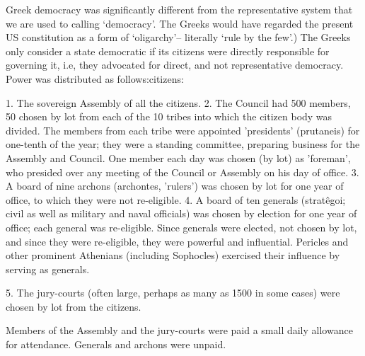 \documentclass[oneside]{article}
\begin{document}
Greek democracy was significantly different from the representative system that we are used to calling ‘democracy’. The Greeks would have regarded the present US constitution as a form of ‘oligarchy’– literally ‘rule by the few’.)  The Greeks only consider a state democratic  if its citizens were directly responsible for governing it, i.e, they advocated for direct, and not representative democracy. Power was distributed as follows:citizens: 

1. The sovereign Assembly of all the citizens. 
2. The Council had 500 members, 50 chosen by lot from each of the 10 tribes into which the citizen body was divided. The members from each tribe were appointed 'presidents' (prutaneis) for one-tenth of the year; they were a standing committee, preparing business for the Assembly and Council. One member each day was chosen (by lot) as 'foreman', who presided over any meeting of the Council or Assembly on his day of office.  
3. A board of nine archons (archontes, 'rulers') was chosen by lot for one year of office, to which they were not re-eligible. 
4. A board of ten generals (stratêgoi;  civil as well as military and naval officials) was 
chosen by election for one year of office; each general was re-eligible. Since generals were elected, not chosen by lot, and since they were re-eligible, they were powerful and influential. Pericles and other prominent Athenians (including Sophocles) exercised 
their influence by serving as generals. 

5. The jury-courts (often large, perhaps as many as 1500 in some cases) were chosen 
by lot from the citizens. 

Members of the Assembly and the jury-courts were paid a small daily allowance for attendance. Generals and archons were unpaid.  
\end{document}
